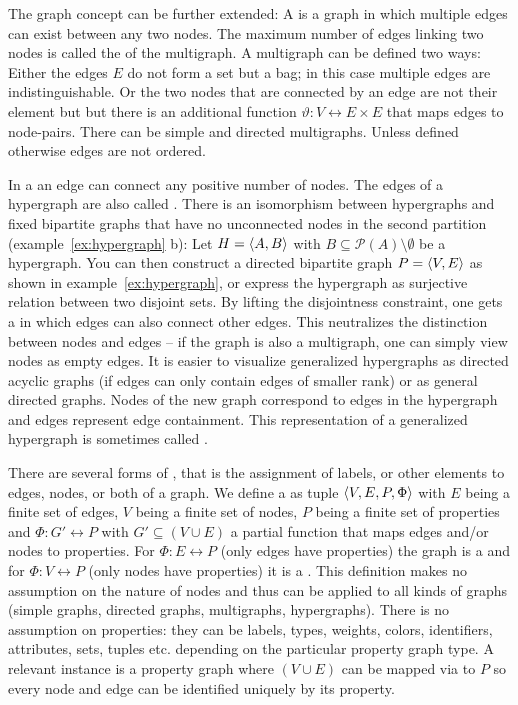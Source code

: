 The graph concept can be further extended: A  is a
graph in which multiple edges can exist between any two nodes. The maximum
number of edges linking two nodes is called the  of the
multigraph. A multigraph can be defined two ways: Either the edges $E$ do not
form a set but a bag; in this case multiple edges are indistinguishable. Or the
two nodes that are connected by an edge are not their element but but there
is an additional function $\vartheta: V \rel E \times E$ that maps edges to
node-pairs. There can be simple and directed multigraphs. Unless defined
otherwise edges are not ordered.

In a  an edge can connect any positive number of nodes. The
edges of a hypergraph are also called . There is an isomorphism
between hypergraphs and fixed bipartite graphs that have no unconnected nodes
in the second partition (example~\ref{ex:hypergraph} {\ormtext b}): Let
$H=\langle A,B \rangle$ with $B \subseteq \mathcal{P}(A) \setminus \emptyset$ be a
hypergraph. You can then construct a directed bipartite graph $P=\langle V,E \rangle$
as shown in example~\ref{ex:hypergraph}, or express the hypergraph as
surjective relation between two disjoint sets. By lifting the disjointness
constraint, one gets a  in which edges can also
connect other edges.  This neutralizes the distinction between nodes and edges
-- if the graph is also a multigraph, one can simply view nodes as empty edges.
It is easier to visualize generalized hypergraphs as directed acyclic graphs
(if edges can only contain edges of smaller rank) or as general directed
graphs. Nodes of the new graph correspond to edges in the hypergraph and edges
represent edge containment. This representation of a generalized hypergraph is
sometimes called .


There are several forms of , that is the assignment of
labels, or other elements to edges, nodes, or both of a graph. We define a
 as tuple $\langle V,E,P,\Phi \rangle$ with $E$ being a
finite set of edges, $V$ being a finite set of nodes, $P$ being a finite set
of properties and $\Phi: G' \rel P$ with $G' \subseteq (V \cup E)$ a partial
function that maps edges and/or nodes to properties. For $\Phi: E \rel P$
(only edges have properties) the graph is a  and for
$\Phi: V \rel P$ (only nodes have properties) it is a . This definition makes no assumption on the nature of nodes and thus
can be applied to all kinds of graphs (simple graphs, directed graphs,
multigraphs, hypergraphs). There is no assumption on properties: they can
be labels, types, weights, colors, identifiers, attributes, sets, tuples etc.
depending on the particular property graph type. A relevant instance is a
property graph where $(V \cup E)$ can be mapped via 
to $P$ so every node and edge can be identified uniquely by its property.

